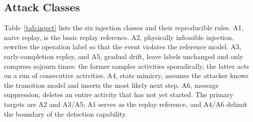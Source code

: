 \documentclass[manuscript,screen,review]{acmart}
\begin{document}
\subsection{Attack Classes}
\label{sec:coverage}

Table~\ref{tab:inject} lists the six injection classes and their reproducible rules. {A1}, naive replay, is the basic replay reference. {A2}, physically infeasible injection, rewrites the operation label so that the event violates the reference model. {A3}, early-completion replay, and {A5}, gradual drift, leave labels unchanged and only compress sojourn times: the former samples activities sporadically, the latter acts on a run of consecutive activities. {A4}, state mimicry, assumes the attacker knows the transition model and inserts the most likely next step. {A6}, message suppression, deletes an entire activity that has not yet started. The primary targets are {A2} and {A3}/{A5}; {A1} serves as the replay reference, and {A4}/{A6} delimit the boundary of the detection capability.
\end{document}
